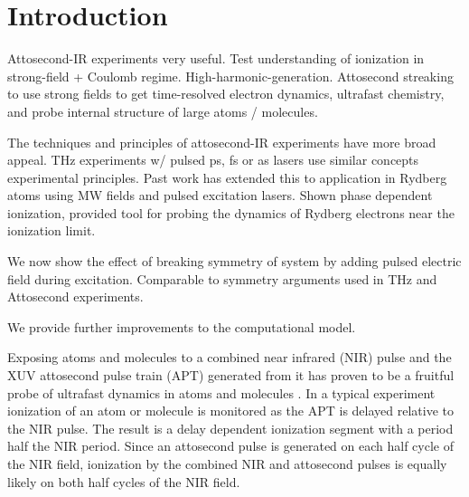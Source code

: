 \documentclass[aps,pra,preprint,groupedaddress]{revtex4-1}
\begin{document}

\section{\label{sec:intro}Introduction}

Attosecond-IR experiments very useful. Test understanding of ionization in strong-field + Coulomb regime. High-harmonic-generation. Attosecond streaking to use strong fields to get time-resolved electron dynamics, ultrafast chemistry, and probe internal structure of large atoms / molecules.

The techniques and principles of attosecond-IR experiments have more broad appeal. THz experiments w/ pulsed ps, fs or as lasers use similar concepts experimental principles. Past work has extended this to application in Rydberg atoms using MW fields and pulsed excitation lasers. Shown phase dependent ionization, provided tool for probing the dynamics of Rydberg electrons near the ionization limit.

We now show the effect of breaking symmetry of system by adding pulsed electric field during excitation. Comparable to symmetry arguments used in THz and Attosecond experiments.

We provide further improvements to the computational model.

Exposing atoms and molecules to a combined near infrared (NIR) pulse and the XUV attosecond pulse train (APT) generated from it has proven to be a fruitful probe of ultrafast dynamics in atoms and molecules \cite{Johnsson, Tong, Neidel}. In a typical experiment ionization of an atom or molecule is monitored as the APT is delayed relative to the NIR pulse. The result is a delay dependent ionization segment with a period half the NIR period. Since an attosecond  pulse is generated on each half cycle of the NIR field, ionization by the combined NIR and attosecond pulses is equally likely on both half cycles of the NIR field.
\end{document}
